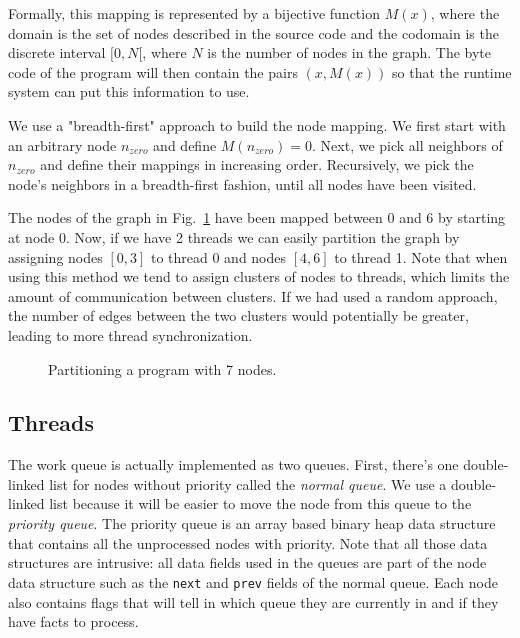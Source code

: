 Formally, this mapping is represented by a bijective function $M(x)$, where the domain is the set
of nodes described in the source code and the codomain is the discrete interval $[0, N[$, where $N$
is the number of nodes in the graph. The byte code of the program will then contain the pairs
$(x, M(x))$ so that the runtime system can put this information to use.

We use a "breadth-first" approach to build the node mapping. We first start with an arbitrary node
$n_{zero}$ and define $M(n_{zero}) = 0$. Next, we pick all neighbors of $n_{zero}$ and define
their mappings in increasing order. Recursively, we pick
the node's neighbors in a breadth-first fashion, until all nodes have been visited.

The nodes of the graph in Fig.~\ref{fig:clustering} have been mapped between 0 and 6 by starting
at node 0. Now, if we have 2 threads we can easily partition the graph by assigning nodes $[0, 3]$
to thread 0 and nodes $[4, 6]$ to thread 1. Note that when using this method we tend to assign
clusters of nodes to threads, which limits the amount of communication between clusters. If we
had used a random approach, the number of edges between the two clusters would potentially be greater,
leading to more thread synchronization.

\begin{figure}[h!]
   \begin{center}
 \end{center}
    \caption{Partitioning a program with 7 nodes.}
    \label{fig:clustering}
\end{figure}

\subsection{Threads}

The work queue is actually implemented as two queues. First, there's one double-linked list for nodes
without priority called the \emph{normal queue}.
We use a double-linked list because it will be easier to move the node from this queue to the
\emph{priority queue}. The priority queue is an array based binary heap data structure that contains
all the unprocessed nodes with priority. Note that all those data structures are intrusive: all data
fields used in the queues are part of the node data structure such as the \texttt{next} and \texttt{prev}
fields of the normal queue. Each node also contains flags that will tell in which queue they are currently
in and if they have facts to process.

